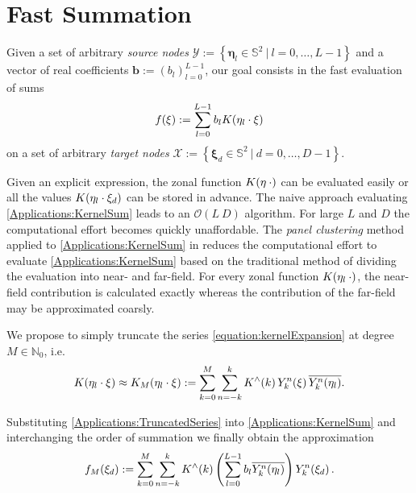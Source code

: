 \documentclass[11pt,a4paper,twoside,bibtotoc]{scrartcl}
\theoremstyle{plain}
\theoremstyle{definition}
\theoremstyle{remark}
\newcommand{\NZ}{\ensuremath{\mathbb{N}_{0}}}
\newcommand{\pset}[3]{\ensuremath{\left\{#1\ \left#2\ #3\right.\right\rbrace}}
\newcommand{\twosphere}{\ensuremath{\mathbb{S}^2}}
\newcommand{\fun}[2]{\ensuremath{#1{\hspace{-0.4ex}}\left(#2\right)}}
\newcommand{\paren}[1]{\ensuremath{\left(#1\right)}}
\newcommand{\bigo}[1]{\ensuremath{\mathcal{O}\paren{#1}}}
\newcommand{\mb}[1]{\mathbf{#1}}
\newcommand{\V}[1]{\mb{#1}}
\numberwithin{equation}{section}
\numberwithin{table}{section}
\numberwithin{figure}{section}
\begin{document}
\section{Fast Summation}
Given a set of arbitrary \emph{source nodes} $\mathcal{Y} :=
  \pset{\V{\eta}_{l} \in \twosphere}{|}{l = 0,\ldots,L-1}$ and a vector of
  real coefficients $\V{b}:=(b_{l})_{l=0}^{L-1}$, our goal consists in the fast
evaluation of sums 
\begin{equation}
  \label{Applications:KernelSum}
  \fun{f}{\xi} := \sum_{l = 0}^{L-1} b_{l} \fun{K}{\V{\eta}_{l} \cdot \V{\xi}}
\end{equation}
on a set of arbitrary \emph{target nodes} $\mathcal{X} := \pset{\V{\xi}_{d}
  \in \twosphere}{|}{d=0,\ldots,D-1}$.

Given an explicit expression, the zonal function $\fun{K}{\V{\eta} \: \cdot}$ 
can be evaluated easily or all the values 
$\fun{K}{\V{\eta}_{l} \cdot \V{\xi}_{d}}$ can be stored in
advance. The naive approach evaluating \eqref{Applications:KernelSum} leads to
an $\bigo{L\:D}$ algorithm. 
For large $L$ and $D$ the computational effort becomes quickly unaffordable.
The \emph{panel clustering} method applied to \eqref{Applications:KernelSum} in \cite{FrGlSch98} reduces the
computational effort to evaluate \eqref{Applications:KernelSum} based on the
traditional method of dividing the evaluation into near- and far-field.
For every zonal function $\fun{K}{\V{\eta}_l \: \cdot}$, the near-field contribution
is calculated exactly whereas the contribution of the far-field may be
approximated coarsly.

We propose to simply truncate the series
\eqref{equation:kernelExpansion} at degree  
$M \in \NZ$, i.e.
\begin{equation}
  \label{Applications:TruncatedSeries}
  \fun{K}{\V{\eta}_{l} \cdot \V{\xi}} \approx \fun{K_{M}}{\V{\eta}_{l} \cdot
  \V{\xi}} := \sum_{k=0}^{M} \sum_{n=-k}^k \fun{K^{\wedge}}{k}
  \fun{Y_{k}^n}{\V{\xi}} \overline{\fun{Y_{k}^n}{\V{\eta}_{l}}}.
\end{equation}

Substituting \eqref{Applications:TruncatedSeries} into
\eqref{Applications:KernelSum} and interchanging the order of summation we
finally obtain the approximation
\[
  \fun{f_{M}}{\xi_{d}} := \sum_{k=0}^{M} \sum_{n=-k}^k \fun{K^{\wedge}}{k}
  \paren{\sum_{l = 0}^{L-1} b_{l} \overline{\fun{Y_{k}^n}{\V{\eta}_{l}}}}
  \fun{Y_{k}^n}{\V{\xi}_{d}}.
\]
\end{document}

